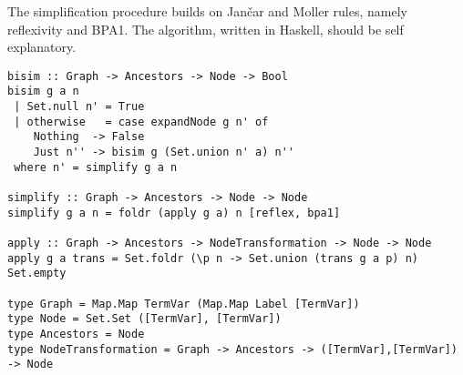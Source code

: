 The simplification procedure builds on  Jan{\v{c}}ar and
Moller rules, namely reflexivity and BPA1.
%
The algorithm, written in Haskell, should be self explanatory.
%
\begin{lstlisting}
bisim :: Graph -> Ancestors -> Node -> Bool
bisim g a n
 | Set.null n' = True
 | otherwise   = case expandNode g n' of
    Nothing  -> False
    Just n'' -> bisim g (Set.union n' a) n''
 where n' = simplify g a n

simplify :: Graph -> Ancestors -> Node -> Node
simplify g a n = foldr (apply g a) n [reflex, bpa1]

apply :: Graph -> Ancestors -> NodeTransformation -> Node -> Node
apply g a trans = Set.foldr (\p n -> Set.union (trans g a p) n) Set.empty

type Graph = Map.Map TermVar (Map.Map Label [TermVar])
type Node = Set.Set ([TermVar], [TermVar])
type Ancestors = Node
type NodeTransformation = Graph -> Ancestors -> ([TermVar],[TermVar]) -> Node
\end{lstlisting}

